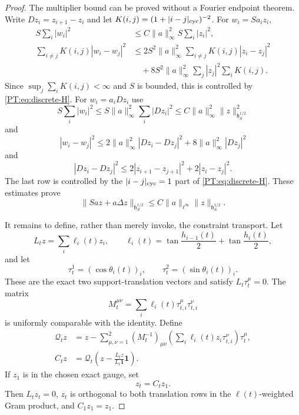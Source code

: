 \begin{proof}
The multiplier bound can be proved without a Fourier endpoint theorem.
Write $Dz_i=z_{i+1}-z_i$ and let $K(i,j)=(1+|i-j|_{\rm cyc})^{-2}$.
For $w_i=Sa_iz_i$,
\begin{align*}
 S\sum_i|w_i|^2&\le C\|a\|_\infty^2S\sum_i|z_i|^2,\\
 \sum_{i\ne j}K(i,j)|w_i-w_j|^2
 &\le2S^2\|a\|_\infty^2
      \sum_{i\ne j}K(i,j)|z_i-z_j|^2\\
 &\quad+8S^2\|a\|_\infty^2
      \sum_j|z_j|^2\sum_iK(i,j).
\end{align*}
Since $\sup_j\sum_iK(i,j)<\infty$ and $S$ is bounded, this is controlled
by \eqref{PT:eq:discrete-H}.  For $w_i=a_iDz_i$ use
\[
 S\sum_i|w_i|^2
 \le S\|a\|_\infty^2\sum_i|Dz_i|^2
 \le C\|a\|_\infty^2\|z\|_{\mathfrak h^{1/2}_S}^2
\]
and
\[
 |w_i-w_j|^2
 \le2\|a\|_\infty^2|Dz_i-Dz_j|^2
     +8\|a\|_\infty^2|Dz_j|^2
\]
and
\[
 |Dz_i-Dz_j|^2
 \le2|z_{i+1}-z_{j+1}|^2+2|z_i-z_j|^2.
\]
The last row is controlled by the $|i-j|_{\rm cyc}=1$ part of
\eqref{PT:eq:discrete-H}.  These estimates prove
\begin{equation}\label{PT:eq:ledger-bound}
 \|Sa z+a\Delta z\|_{\mathfrak h^{1/2}_S}
 \le C\|a\|_{\ell^\infty}
       \|z\|_{\mathfrak h^{1/2}_S}.
\end{equation}

It remains to define, rather than merely invoke, the constraint
transport.  Let
\begin{equation}\label{PT:eq:area-row}
 L_tz=\sum_i\ell_i(t)z_i,\qquad
 \ell_i(t)=\tan\frac{h_{i-1}(t)}2+\tan\frac{h_i(t)}2,
\end{equation}
and let
\[
 \tau_t^1=(\cos\theta_i(t))_i,\qquad
 \tau_t^2=(\sin\theta_i(t))_i.
\]
These are the exact two support-translation vectors and satisfy
$L_t\tau_t^\mu=0$.  The matrix
\begin{equation}\label{PT:eq:translation-Gram}
 M_t^{\mu\nu}=\sum_i\ell_i(t)\tau_{t,i}^\mu\tau_{t,i}^\nu
\end{equation}
is uniformly comparable with the identity.  Define
\begin{align}
 \mathcal Q_tz
 &=z-\sum_{\mu,\nu=1}^2(M_t^{-1})_{\mu\nu}
 \left(\sum_i\ell_i(t)z_i\tau_{t,i}^\nu\right)\tau_t^\mu,
 \label{PT:eq:translation-projection}\\
 C_tz
 &=\mathcal Q_t\left(z-\frac{L_tz}{L_t\mathbf1}\mathbf1\right).
 \label{PT:eq:constraint-transport}
\end{align}
If $z_1$ is in the chosen exact gauge, set
\begin{equation}\label{PT:eq:z-transport}
 z_t=C_tz_1.
\end{equation}
Then $L_tz_t=0$, $z_t$ is orthogonal to both translation rows in the
$\ell(t)$-weighted Gram product, and $C_1z_1=z_1$.


\end{proof}
